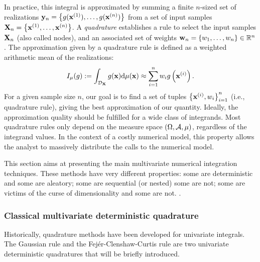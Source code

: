 In practice, this integral is approximated by summing a finite $n$-sized set of realizations ${\bf y}_n = \left\{g({\bf x}^{(1)}), \dots, g({\bf x}^{(n)})\right\}$ from a set of input samples ${\bf X}_n = \left\{{\bf x}^{(1)}, \dots, {\bf x}^{(n)}\right\}$. 
A \textit{quadrature} establishes a rule to select the input samples ${\bf X}_n$ (also called nodes), and an associated set of weights ${\bf w}_n = \{w_1, \dots, w_n\} \in \mathbb{R}^n$. 
The approximation given by a quadrature rule is defined as a weighted arithmetic mean of the realizations:
\begin{equation}
    I_{\mu}(g) := \int_{\mathcal{D}_{\bf X}} g({\bf x}) \mathrm{d}\mu({\bf x}) \approx \sum_{i=1}^n w_i g\left({\bf x}^{(i)}\right).
    \label{eq:quadrature_rule}
\end{equation}
For a given sample size $n$, our goal is to find a set of tuples $\left\{{\bf x}^{(i)}, w_i \right\}_{i=1}^n$ (i.e., quadrature rule), giving the best approximation of our quantity. 
Ideally, the approximation quality should be fulfilled for a wide class of integrands. 
Most quadrature rules only depend on the measure space $(\Omega, \mathcal{A}, \mu)$, regardless of the integrand values.
In the context of a costly numerical model, this property allows the analyst to massively distribute the calls to the numerical model. 

This section aims at presenting the main multivariate numerical integration techniques. 
These methods have very different properties: 
some are deterministic and some are aleatory; 
some are sequential (or nested) some are not; 
some are victims of the curse of dimensionality and some are not. 
.


\subsubsection{Classical multivariate deterministic quadrature}

Historically, quadrature methods have been developed for univariate integrals. 
The Gaussian rule and the Fejér-Clenshaw-Curtis rule are two univariate deterministic quadratures that will be briefly introduced. 

